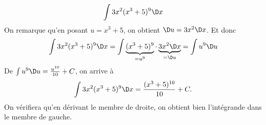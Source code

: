 \begin{frame}
  \begin{example}
    \begin{equation*}
      \int 3 x^2 (x^3 + 5)^9 \D x
    \end{equation*}\pause{}
    On remarque qu'en posant $u = x^3 + 5$\pause{}, on obtient $\D u = 3x^2\D x$.\pause{} Et donc
    \begin{equation*}
      \int 3 x^2 (x^3 + 5)^9 \D x
      = \int \underbrace{(x^3 + 5)^9}_{=u^9} \cdot \underbrace{3x^2 \D x}_{= \D u}
      = \int u^9 \D u
    \end{equation*}\pause{}
    De $\int u^9 \D u = \frac{u^{10}}{10} + C$,\pause{} on arrive à
    \begin{equation*}
      \int 3 x^2 (x^3 + 5)^9 \D x = \frac{(x^3 + 5)^{10}}{10} + C.
    \end{equation*}\pause{}
    On vérifiera qu'en dérivant le membre de droite, on obtient bien l'intégrande dans le membre de gauche.
  \end{example}
\end{frame}
